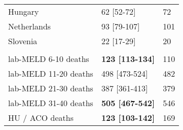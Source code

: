 \begin{tabular}{L{5.4cm} R{4.2cm} L{2.6cm}}
	\hspace{1em}Hungary & 62     [52-72] & 72 \\
	\hspace{1em}Netherlands & 93     [79-107] & 101 \\
	\hspace{1em}Slovenia & 22     [17-29] & 20 \\
	\addlinespace[0.3em]
	\\[.05cm]
	\hspace{1em}lab-MELD 6-10 deaths & \textbf{123    [113-134]} & 110 \\
	\hspace{1em}lab-MELD 11-20 deaths & 498    [473-524] & 482 \\
	\hspace{1em}lab-MELD 21-30 deaths & 387    [361-413] & 379 \\
	\hspace{1em}lab-MELD 31-40 deaths & \textbf{505 [467-542]} & 546 \\
	\hspace{1em}HU / ACO deaths & \textbf{123    [103-142]} & 169 \\
	\bottomrule
\end{tabular}
